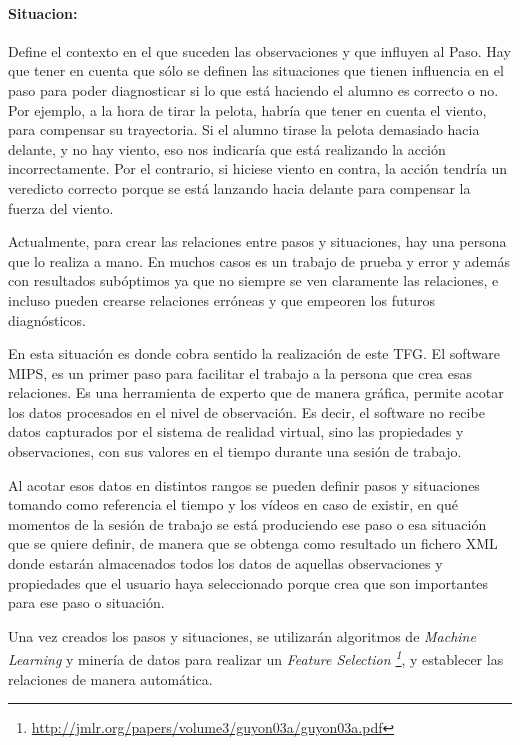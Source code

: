 \paragraph{\textbf{Situacion:}}
Define el contexto en el que suceden las observaciones y que influyen al Paso. Hay que
tener en cuenta que s\'olo se definen las situaciones que tienen influencia en el paso
para poder diagnosticar si lo que est\'a haciendo el alumno es correcto o no. Por ejemplo, a la hora
de tirar la pelota, habr\'ia que tener en cuenta el viento, para compensar su trayectoria. Si el alumno
tirase la pelota demasiado hacia delante, y no hay viento, eso nos indicar\'ia que est\'a realizando la acci\'on
incorrectamente. Por el contrario, si hiciese viento en contra, la acci\'on tendr\'ia un veredicto correcto
porque se est\'a lanzando hacia delante para compensar la fuerza del viento.

Actualmente, para crear las relaciones entre pasos y situaciones, hay una persona que lo realiza a mano. En muchos casos
es un trabajo de prueba y error y adem\'as con resultados sub\'optimos ya que no siempre se ven claramente las relaciones,
e incluso pueden crearse relaciones err\'oneas y que empeoren los futuros diagn\'osticos.

En esta situaci\'on es donde cobra sentido la realizaci\'on de este TFG. El software MIPS, es un primer paso para facilitar
el trabajo a la persona que crea esas relaciones. Es una herramienta de experto 
que de manera gr\'afica, permite
acotar los datos procesados en el nivel de observaci\'on. Es decir, el software no recibe datos capturados por
el sistema de realidad virtual, sino
las propiedades y observaciones, con sus valores en el tiempo durante una sesi\'on de trabajo.

Al acotar esos datos en distintos rangos se pueden definir pasos y situaciones tomando como referencia
el tiempo y los v\'ideos en caso de existir, en qu\'e momentos de la sesi\'on de trabajo
se est\'a produciendo ese paso o esa situaci\'on que se quiere definir, de manera que se obtenga
como resultado un fichero XML donde estar\'an almacenados todos los datos de aquellas observaciones y 
propiedades que el usuario haya seleccionado porque crea que son importantes para ese paso o 
situaci\'on.

Una vez creados los pasos y situaciones, se utilizar\'an algoritmos de \emph{Machine Learning} 
y miner\'ia de datos para
realizar un \emph{Feature Selection 
\footnote{\url{http://jmlr.org/papers/volume3/guyon03a/guyon03a.pdf}}},
y establecer las relaciones de manera autom\'atica.

